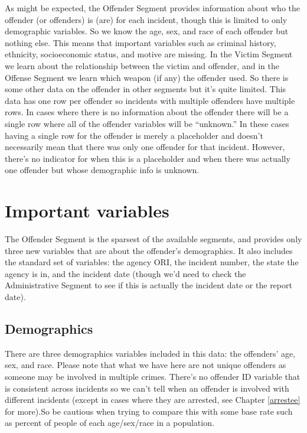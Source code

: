 \documentclass[
  12pt,
  openany]{book}
\begin{document}
As might be expected, the Offender Segment provides information about who the offender (or offenders) is (are) for each incident, though this is limited to only demographic variables. So we know the age, sex, and race of each offender but nothing else. This means that important variables such as criminal history, ethnicity, socioeconomic status, and motive are missing. In the Victim Segment we learn about the relationship between the victim and offender, and in the Offense Segment we learn which weapon (if any) the offender used. So there is some other data on the offender in other segments but it's quite limited. This data has one row per offender so incidents with multiple offenders have multiple rows. In cases where there is no information about the offender there will be a single row where all of the offender variables will be ``unknown.'' In these cases having a single row for the offender is merely a placeholder and doesn't necessarily mean that there was only one offender for that incident. However, there's no indicator for when this is a placeholder and when there was actually one offender but whose demographic info is unknown.

\hypertarget{important-variables-2}{%
\section{Important variables}\label{important-variables-2}}

The Offender Segment is the sparsest of the available segments, and provides only three new variables that are about the offender's demographics. It also includes the standard set of variables: the agency ORI, the incident number, the state the agency is in, and the incident date (though we'd need to check the Administrative Segment to see if this is actually the incident date or the report date).

\hypertarget{demographics}{%
\subsection{Demographics}\label{demographics}}

There are three demographics variables included in this data: the offenders' age, sex, and race. Please note that what we have here are not unique offenders as someone may be involved in multiple crimes. There's no offender ID variable that is consistent across incidents so we can't tell when an offender is involved with different incidents (except in cases where they are arrested, see Chapter \ref{arrestee} for more).So be cautious when trying to compare this with some base rate such as percent of people of each age/sex/race in a population.
\end{document}
